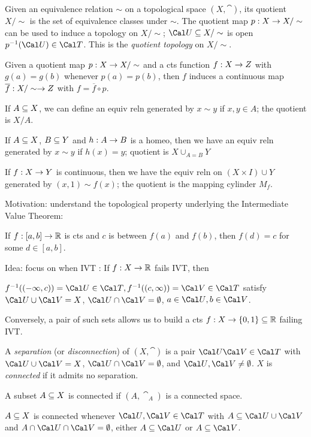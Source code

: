 Given an equivalence relation $\sim$ on a topological space $(X,\cat)$, its quotient $X/\sim$
is the set of equivalence classes under $\sim$. The quotient map $p: X\rightarrow X/\sim$ can be used
to induce a topology on $X/\sim$; $\cau\sset X/\sim$ is open \lra $p^{-1}(\cau)\in \cat$. This 
is the {\it quotient topology} on $X/\sim$.

\ssk

Given a quotient map $p:X \rightarrow X/\sim$ and a cts function $f:X \rightarrow Z$ with $g(a)=g(b)$ 
whenever $p(a)=p(b)$, then $f$ induces a continuous map $\overline{f}:X/\sim \rightarrow Z$ 
with $f=\overline{f}\circ p$.

\ssk

\hsk If $A\subseteq X$, we can define an equiv reln generated by $x\sim y$ if $x,y\in A$; the quotient is $X/A$.

\hsk If $A\subseteq X$, $B\subseteq Y$ and $h:A\rightarrow B$ is a homeo, then we have an equiv reln generated by $x\sim y$ if $h(x)=y$; quotient is $X\cup_{A=B} Y$

\hsk If $f: X\rightarrow Y$ is continuous, then we have the equiv reln on $(X\times I)\cup Y$ generated by $(x,1)\sim f(x)$;
the quotient is the mapping cylinder $M_f$.

\msk


Motivation: understand the topological property underlying the Intermediate Value Theorem:

\hsk If $f:[a,b]\rightarrow{\Bbb R}$ is cts and $c$ is between $f(a)$ and $f(b)$, then $f(d)=c$ for some $d\in [a,b]$.

Idea: focus on when IVT : If $f: X\rightarrow {\Bbb R}$ fails IVT, then

\hsk $\finv((-\infty,c))=\cau\in\cat, \finv((c,\infty))=\cav\in\cat$ satisfy $\cau\cup\cav =X$, $\cau\cap\cav = \emptyset$, $a\in\cau,b\in\cav$.

Conversely, a pair of such sets allows us to build a cts $f: X\rightarrow \{0,1\}\subseteq {\Bbb R}$ failing IVT.

\ssk

A {\it separation} (or {\it disconnection}) of $(X,\cat)$ is a pair $\cau\cav\in\cat$ with $\cau\cup\cav =X$, $\cau\cap\cav = \emptyset$, and $\cau,\cav\neq\emptyset$. $X$ is {\it connected} if it admits no separation.

\hsk A subset $A\subseteq X$ is connected if $(A,\cat_A)$ is a connected space.

\hsk $A\subseteq X$ is connected \lra whenever $\cau,\cav\in\cat$ with $A\sset\cau\cup\cav$ and 
$A\cap\cau\cap\cav=\emptyset$, either $A\sset\cau$ or $A\sset\cav$.

